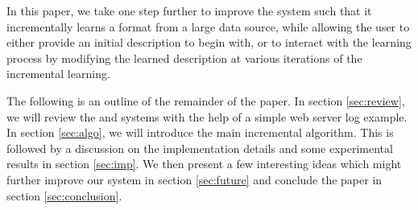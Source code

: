 In this paper, we take one step further to improve the \learnpads{} system
such that it incrementally learns a format from a large data source,
while allowing the user to either provide an initial description to begin with,
or to interact with the learning process by modifying the learned description
at various iterations of the incremental learning.

The following is an outline of the remainder of the paper. In section \ref{sec:review},
we will review the \pads{} and \learnpads{} systems with the help of a simple web server
log example. In section \ref{sec:algo}, we will introduce the main incremental
algorithm. This is followed by a discussion on the implementation details and
some experimental results in section \ref{sec:imp}. We then present a few interesting
ideas which might further improve our system in section \ref{sec:future} and conclude
the paper in section \ref{sec:conclusion}.

%
%
%
